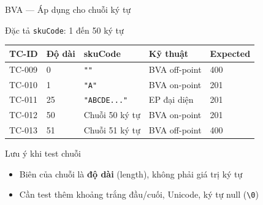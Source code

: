 \documentclass[aspectratio=169,12pt]{beamer}
\begin{document}
\begin{frame}[shrink=10]{BVA --- Áp dụng cho chuỗi ký tự}
  \begin{block}{Đặc tả \texttt{skuCode}: 1 đến 50 ký tự}
  \end{block}

  \vspace{0.3em}
  \begin{center}
  \small
  \begin{tabular}{lllll}
    \toprule
    \textbf{TC-ID} & \textbf{Độ dài} & \textbf{skuCode} & \textbf{Kỹ thuật} & \textbf{Expected} \\
    \midrule
    TC-009 & 0   & \texttt{""}                & BVA off-point & 400 \\
    TC-010 & 1   & \texttt{"A"}               & BVA on-point  & 201 \\
    TC-011 & 25  & \texttt{"ABCDE..."}         & EP đại diện   & 201 \\
    TC-012 & 50  & Chuỗi 50 ký tự             & BVA on-point  & 201 \\
    TC-013 & 51  & Chuỗi 51 ký tự             & BVA off-point & 400 \\
    \bottomrule
  \end{tabular}
  \end{center}

  \vspace{0.3em}
  \begin{exampleblock}{Lưu ý khi test chuỗi}
    \begin{itemize}
      \item Biên của chuỗi là \textbf{độ dài} (length), không phải giá trị ký tự
      \item Cần test thêm khoảng trắng đầu/cuối, Unicode, ký tự null (\texttt{\textbackslash{}0})
    \end{itemize}
  \end{exampleblock}
\end{frame}
\end{document}
